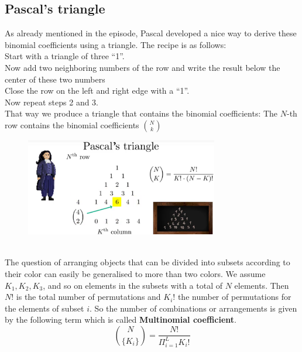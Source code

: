 \documentclass[12pt, a4paper]{scrartcl}
\begin{document}
\subsection*{Pascal’s triangle }
As already mentioned in the episode, Pascal developed a nice way to derive these binomial coefficients using a triangle.
The recipe is as follows:\\
      Start with a  triangle of three ``1''.\\
      Now add two neighboring numbers of the row and write the result below the center of these two numbers\\
      Close the row on the left and right edge with a ``1''.\\
Now repeat steps 2 and 3.\\
That way we produce a triangle that contains the binomial coefficients: The $N$-th row contains the binomial coefficients ${N \choose k} $\\
 \begin{figure}[H]
	\centering
	\includegraphics[width=0.75\textwidth]{4_3.png}
\end{figure}
\\

The question of arranging objects that can be divided into subsets according to their color can easily be generalised to more than two colors. We assume $K_1, K_2, K_3$, and so on elements in the subsets with a total of $N$ elements.
Then $N!$ is the total number of permutations and $K_i!$ the number of permutations for the elements of subset $i$.
So the number of combinations or arrangements is given by the following term which is called \textbf{Multinomial coefficient}.\\
\begin{equation*}\boxed{{N\choose \{K_i\}}=\frac{N!}{\Pi_{i=1}^LK_i!}
}\end{equation*}\\
\end{document}
